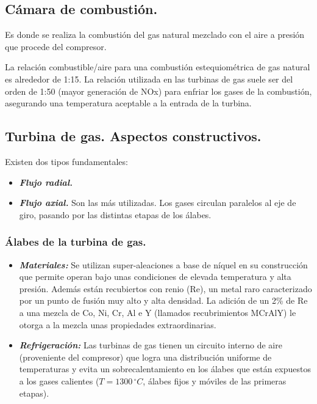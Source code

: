 		\subsection{Cámara de combustión.}
			Es donde se realiza la combustión del gas natural mezclado con el aire a presión que procede del compresor.
			
			
			La relación combustible/aire para una combustión estequiométrica de gas natural es alrededor de 1:15. La relación utilizada en las turbinas de gas suele ser del orden de 1:50 (mayor generación de NOx) para enfriar los gases de la combustión, asegurando una temperatura aceptable a la entrada de la turbina.
		
		\subsection{Turbina de gas. Aspectos constructivos.}
			Existen dos tipos fundamentales:
			\begin{itemize}
				\item \textbf{\textit{Flujo radial.}}
				\item \textbf{\textit{Flujo axial.}} Son las más utilizadas. Los gases circulan paralelos al eje de giro, pasando por las distintas etapas de los álabes.
			\end{itemize}
			
			\subsubsection{Álabes de la turbina de gas.}
				\begin{itemize}
					\item \textbf{\textit{Materiales:}} Se utilizan super-aleaciones a base de níquel en su construcción que permite operan bajo unas condiciones de elevada temperatura y alta presión. Además están recubiertos con renio (Re), un metal raro caracterizado por un punto de fusión muy alto y alta
					densidad. La adición de un 2\% de Re a una mezcla de Co, Ni, Cr, Al e Y	(llamados recubrimientos MCrAlY) le otorga a la mezcla unas propiedades extraordinarias.
					
					\item \textbf{\textit{Refrigeración:}} Las turbinas de gas tienen un circuito interno de aire (proveniente del compresor) que logra una distribución
					uniforme de temperaturas y evita un sobrecalentamiento en los álabes que están expuestos a los gases calientes ($T=1300\,^\circ C$, álabes fijos y móviles de las primeras etapas). 
				\end{itemize}
			
